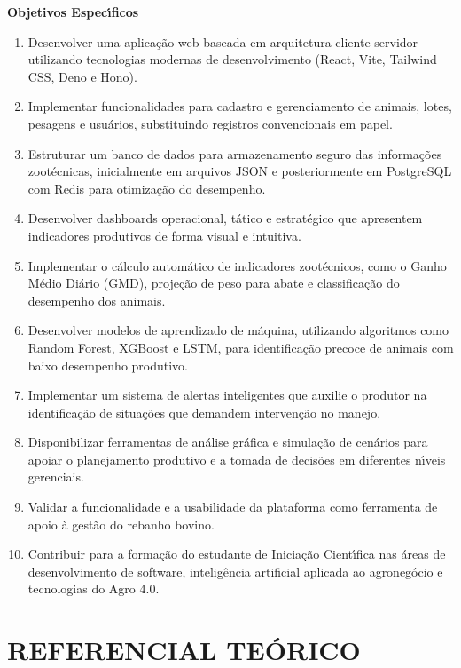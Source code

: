\documentclass[12pt,a4paper]{article}
\begin{document}
\textbf{Objetivos Espec\'{\i}ficos}

\begin{enumerate}[leftmargin=*]
\item Desenvolver uma aplica\c c\~ao web baseada em arquitetura cliente servidor utilizando tecnologias modernas de desenvolvimento (React, Vite, Tailwind CSS, Deno e Hono).
\item Implementar funcionalidades para cadastro e gerenciamento de animais, lotes, pesagens e usu\'arios, substituindo registros convencionais em papel.
\item Estruturar um banco de dados para armazenamento seguro das informa\c c\~oes zoot\'ecnicas, inicialmente em arquivos JSON e posteriormente em PostgreSQL com Redis para otimiza\c c\~ao do desempenho.
\item Desenvolver dashboards operacional, t\'atico e estrat\'egico que apresentem indicadores produtivos de forma visual e intuitiva.
\item Implementar o c\'alculo autom\'atico de indicadores zoot\'ecnicos, como o Ganho M\'edio Di\'ario (GMD), proje\c c\~ao de peso para abate e classifica\c c\~ao do desempenho dos animais.
\item Desenvolver modelos de aprendizado de m\'aquina, utilizando algoritmos como Random Forest, XGBoost e LSTM, para identifica\c c\~ao precoce de animais com baixo desempenho produtivo.
\item Implementar um sistema de alertas inteligentes que auxilie o produtor na identifica\c c\~ao de situa\c c\~oes que demandem interven\c c\~ao no manejo.
\item Disponibilizar ferramentas de an\'alise gr\'afica e simula\c c\~ao de cen\'arios para apoiar o planejamento produtivo e a tomada de decis\~oes em diferentes n\'{\i}veis gerenciais.
\item Validar a funcionalidade e a usabilidade da plataforma como ferramenta de apoio \`a gest\~ao do rebanho bovino.
\item Contribuir para a forma\c c\~ao do estudante de Inicia\c c\~ao Cient\'{\i}fica nas \'areas de desenvolvimento de software, intelig\^encia artificial aplicada ao agroneg\'ocio e tecnologias do Agro 4.0.
\end{enumerate}

\section{REFERENCIAL TE\'ORICO}
\end{document}
